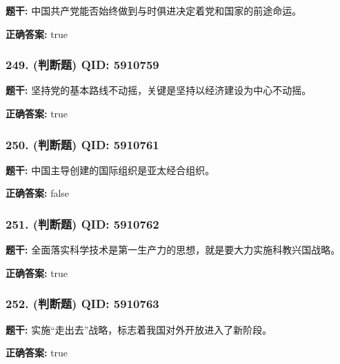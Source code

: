 \documentclass[12pt,UTF8]{ctexart}
\begin{document}
\textbf{题干:}
中国共产党能否始终做到与时俱进决定着党和国家的前途命运。

\textbf{正确答案:}
true

\vspace{0.3em}\hrulefill\vspace{0.7em}

\subsubsection*{249. (判断题) \small QID: 5910759}

\textbf{题干:}
坚持党的基本路线不动摇，关键是坚持以经济建设为中心不动摇。

\textbf{正确答案:}
true

\vspace{0.3em}\hrulefill\vspace{0.7em}

\subsubsection*{250. (判断题) \small QID: 5910761}

\textbf{题干:}
中国主导创建的国际组织是亚太经合组织。

\textbf{正确答案:}
false

\vspace{0.3em}\hrulefill\vspace{0.7em}

\subsubsection*{251. (判断题) \small QID: 5910762}

\textbf{题干:}
全面落实科学技术是第一生产力的思想，就是要大力实施科教兴国战略。

\textbf{正确答案:}
true

\vspace{0.3em}\hrulefill\vspace{0.7em}

\subsubsection*{252. (判断题) \small QID: 5910763}

\textbf{题干:}
实施“走出去”战略，标志着我国对外开放进入了新阶段。

\textbf{正确答案:}
true

\vspace{0.3em}\hrulefill\vspace{0.7em}
\end{document}

